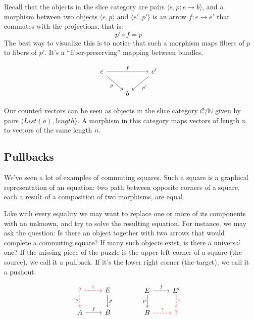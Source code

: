 \documentclass[DaoFP]{subfiles}
\begin{document}
Recall that the objects in the slice category are pairs $\langle e, p \colon e \to b \rangle$, and a morphism between two objects $\langle e, p \rangle$ and $\langle e', p' \rangle$ is an arrow $f \colon e \to e'$ that commutes with the projections, that is:
\[p' \circ f = p \]
The best way to visualize this is to notice that such a morphism maps fibers of $p$ to fibers of $p'$. It's a ``fiber-preserving'' mapping between bundles.

\[
 \begin{tikzcd}
 e
 \arrow[rd, "p"']
 \arrow[rr, "f"]
 && e'
 \arrow[ld, "p'"]
 \\
 &b
  \end{tikzcd}
\]

Our counted vectors can be seen as objects in the slice category $\mathcal{C}/\mathbb{N}$ given by pairs $\langle \mathit{List}(a), \mathit{length} \rangle$. A morphism in this category maps vectors of length $n$ to vectors of the same length $n$.

\subsection{Pullbacks}

We've seen a lot of examples of commuting squares. Such a square is a graphical representation of an equation: two path between opposite corners of a square, each a result of a composition of two morphisms, are equal. 

Like with every equality we may want to replace one or more of its components with an unknown, and try to solve the resulting equation. For instance, we may ask the question: Is there an object together with two arrows that would complete a commuting square? If many such objects exist, is there a universal one? If the missing piece of the puzzle is the upper left corner of a square (the source), we call it a pullback. If it's the lower right corner (the target), we call it a pushout.

\[
 \begin{tikzcd}
 \color{red}?
 \arrow[d, red, dashed, "?"']
 \arrow[r, red, dashed, "?"]
 & E
 \arrow[d, "p"]
 \\
 A
 \arrow[r, "f"]
 &B
\end{tikzcd}
\hspace{40pt}
\begin{tikzcd}
 E
 \arrow[d, "p"']
 \arrow[r, "f"]
 & E'
 \arrow[d, red, dashed, "?"]
 \\
 B
 \arrow[r, red, dashed, "?"]
 &\color{red}?
 \end{tikzcd}
\]
\end{document}
